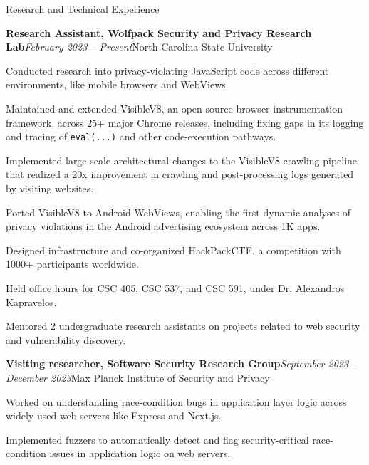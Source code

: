 \documentclass{resume} %
\begin{document}
\begin{rSection}{Research and Technical Experience}
\begin{rSubsection}{\bf Research Assistant, Wolfpack Security and Privacy Research Lab}{\em February 2023 -- Present}{North Carolina State University}{}
\item Conducted research into privacy-violating JavaScript code across different environments, like mobile browsers and WebViews.
\item Maintained and extended VisibleV8, an open-source browser instrumentation framework, across 25+ major Chrome releases, including fixing gaps in its logging and tracing of \texttt{eval(...)} and other code-execution pathways.
\item Implemented large-scale architectural changes to the VisibleV8 crawling pipeline that realized a 20x improvement in crawling and post-processing logs generated by visiting websites.
\item Ported VisibleV8 to Android WebViews, enabling the first dynamic analyses of privacy violations in the Android advertising ecosystem across 1K apps.
\item Designed infrastructure and co-organized HackPackCTF, a competition with 1000+ participants worldwide.
\item Held office hours for CSC 405, CSC 537, and CSC 591, under Dr. Alexandros Kapravelos.
\item Mentored 2 undergraduate research assistants on projects related to web security and vulnerability discovery.
\end{rSubsection}
\begin{rSubsection}{\bf Visiting researcher, Software Security Research Group}{\em September 2023 - December 2023}{Max Planck Institute of Security and Privacy}{}
\item Worked on understanding race-condition bugs in application layer logic across widely used web servers like Express and Next.js.
\item Implemented fuzzers to automatically detect and flag security-critical race-condition issues in application logic on web servers.

\end{rSubsection}
\end{rSection}
\end{document}
